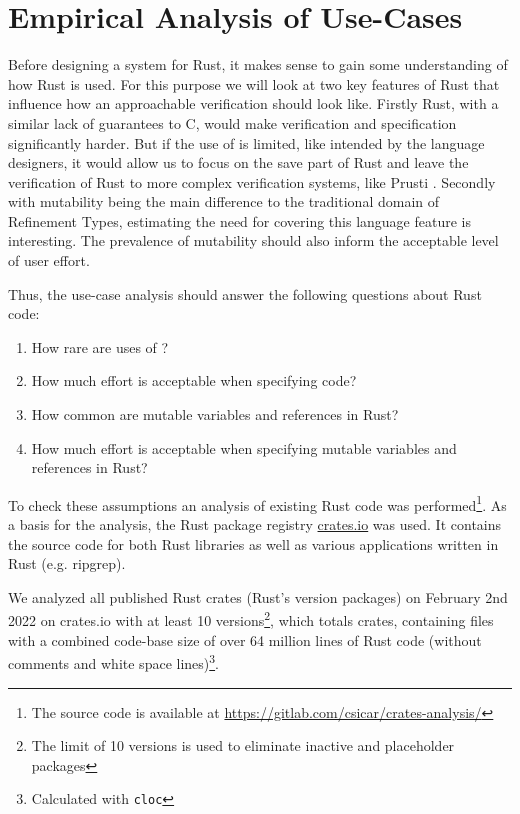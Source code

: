 \documentclass[twoside, english]{sdqthesis}
\theoremstyle{definition}
\begin{document}
\chapter{Empirical Analysis of Use-Cases} \label{ch:analysis} 

Before designing a system for Rust, it makes sense to gain some understanding of how Rust is used. For this purpose we will look at two key features of Rust that influence how an approachable verification should look like.
Firstly  Rust, with a similar lack of guarantees to C, would make verification and specification significantly harder. But if the use of  is limited, like intended by the language designers, it would allow us to focus on the save part of Rust and leave the verification of  Rust to more complex verification systems, like Prusti \cite{astrauskas_leveraging_2019}.
Secondly with mutability being the main difference to the traditional domain of Refinement Types, estimating the need for covering this language feature is interesting. The prevalence of mutability should also inform the acceptable level of user effort.

Thus, the use-case analysis should answer the following questions about Rust code:
\begin{enumerate}
  \item How rare are uses of ?
  \item How much effort is acceptable when specifying  code?
  \item How common are mutable variables and references in Rust?
  \item How much effort is acceptable when specifying mutable variables and references in Rust?
\end{enumerate}

To check these assumptions an analysis of existing Rust code was performed\footnote{The source code is available at \url{https://gitlab.com/csicar/crates-analysis/}}. As a basis for the analysis, the Rust package registry \href{https://www.crates.io}{crates.io} was used. It contains the source code for both Rust libraries as well as various applications written in Rust (e.g. ripgrep). 

We analyzed all published Rust crates (Rust's version packages) on February 2nd 2022 on crates.io with at least 10 versions\footnote{The limit of 10 versions is used to eliminate inactive and placeholder packages}, which totals  crates, containing  files with a combined code-base size of over 64 million lines of Rust code (without comments and white space lines)\footnote{Calculated with \texttt{cloc}}. 
\end{document}
